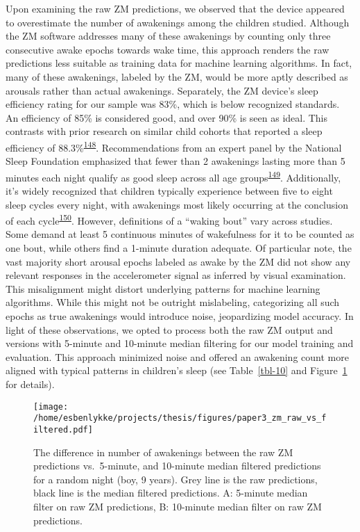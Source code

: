 \documentclass[
  10pt,
]{scrbook}
\begin{document}
\endgroup

Upon examining the raw ZM predictions, we observed that the device
appeared to overestimate the number of awakenings among the children
studied. Although the ZM software addresses many of these awakenings by
counting only three consecutive awake epochs towards wake time, this
approach renders the raw predictions less suitable as training data for
machine learning algorithms. In fact, many of these awakenings, labeled
by the ZM, would be more aptly described as arousals rather than actual
awakenings. Separately, the ZM device's sleep efficiency rating for our
sample was 83\%, which is below recognized standards. An efficiency of
85\% is considered good, and over 90\% is seen as ideal. This contrasts
with prior research on similar child cohorts that reported a sleep
efficiency of
88.3\%\textsuperscript{\protect\hyperlink{ref-galland_2018}{148}}.
Recommendations from an expert panel by the National Sleep Foundation
emphasized that fewer than 2 awakenings lasting more than 5 minutes each
night qualify as good sleep across all age
groups\textsuperscript{\protect\hyperlink{ref-ohayon_2017}{149}}.
Additionally, it's widely recognized that children typically experience
between five to eight sleep cycles every night, with awakenings most
likely occurring at the conclusion of each
cycle\textsuperscript{\protect\hyperlink{ref-galland_normal_2012}{150}}.
However, definitions of a ``waking bout'' vary across studies. Some
demand at least 5 continuous minutes of wakefulness for it to be counted
as one bout, while others find a 1-minute duration adequate. Of
particular note, the vast majority short arousal epochs labeled as awake
by the ZM did not show any relevant responses in the accelerometer
signal as inferred by visual examination. This misalignment might
distort underlying patterns for machine learning algorithms. While this
might not be outright mislabeling, categorizing all such epochs as true
awakenings would introduce noise, jeopardizing model accuracy. In light
of these observations, we opted to process both the raw ZM output and
versions with 5-minute and 10-minute median filtering for our model
training and evaluation. This approach minimized noise and offered an
awakening count more aligned with typical patterns in children's sleep
(see Table~\ref{tbl-10} and Figure~\ref{fig-paper3_raw_filt} for
details).

\begin{figure}

{\centering \texttt{[image: /home/esbenlykke/projects/thesis/figures/paper3\_zm\_raw\_vs\_filtered.pdf]}

}

\caption{\label{fig-paper3_raw_filt}The difference in number of
awakenings between the raw ZM predictions vs.~5-minute, and 10-minute
median filtered predictions for a random night (boy, 9 years). Grey line
is the raw predictions, black line is the median filtered predictions.
A: 5-minute median filter on raw ZM predictions, B: 10-minute median
filter on raw ZM predictions.}

\end{figure}
\end{document}
